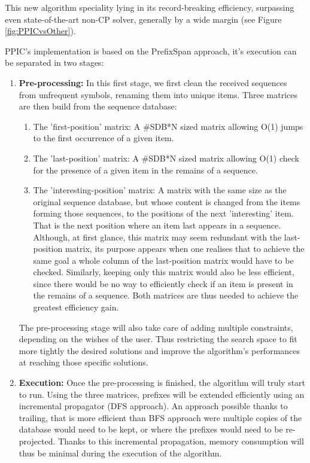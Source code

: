 \documentclass{eplmastersthesis}
\begin{document}
This new algorithm speciality lying in its record-breaking efficiency, surpassing even state-of-the-art non-CP solver, generally by a wide margin (see Figure \ref{fig:PPICvsOther}).

PPIC's implementation is based on the PrefixSpan approach, it's execution can be separated in two stages:

\begin{enumerate}
\item \textbf{Pre-processing:} In this first stage, we first clean the received sequences from unfrequent symbols, renaming them into unique items. Three matrices are then build from the sequence database:
	\begin{enumerate}
		\item The 'first-position' matrix: A \#SDB*N sized matrix allowing O(1) jumps to the first occurrence of a given item. 
		\item The 'last-position' matrix: A  \#SDB*N sized matrix allowing O(1) check for the presence of a given item in the remains of a sequence.
		\item The 'interesting-position' matrix: A matrix with the same size as the original sequence database, but whose content is changed from the items forming those sequences, to the positions of the next 'interesting' item. That is the next position where an item last appears in a sequence. \\ Although, at first glance, this matrix may seem redundant with the last-position matrix, its purpose appears when one realises that to achieve the same goal a whole column of the last-position matrix would have to be checked. Similarly, keeping only this matrix would also be less efficient, since there would be no way to efficiently check if an item is present in the remains of a sequence. Both matrices are thus needed to achieve the greatest efficiency gain. 
	\end{enumerate}
	
	The pre-processing stage will also take care of adding multiple constraints, depending on the wishes of the user. Thus restricting the search space to fit more tightly the desired solutions and improve the algorithm's performances at reaching those specific solutions.
	
\item \textbf{Execution:} Once the pre-processing is finished, the algorithm will truly start to run. Using the three matrices, prefixes will be extended efficiently using an incremental propagator (DFS approach). An approach possible thanks to trailing, that is more efficient than BFS approach were multiple copies of the database would need to be kept, or where the prefixes would need to be re-projected. Thanks to this incremental propagation, memory consumption will thus be minimal during the execution of the algorithm. \newline


\end{enumerate}
\end{document}
